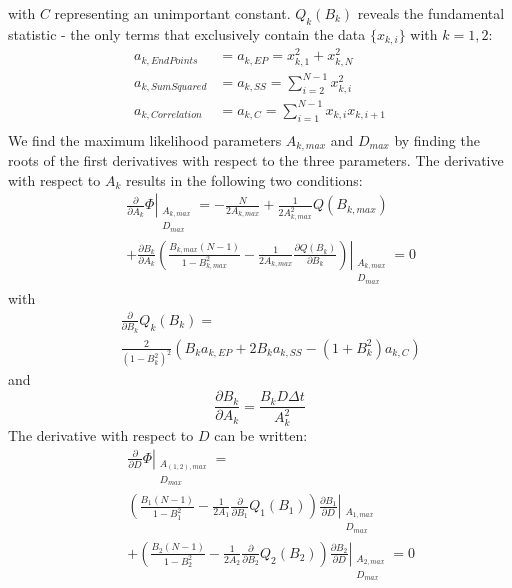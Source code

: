 \documentclass[%
 reprint,
 amsmath,amssymb,
 aps,
]{revtex4-1}
\begin{document}
with $C$ representing an unimportant constant. $Q_{k}(B_{k})$ reveals the fundamental statistic - the only terms that exclusively contain the data $\{x_{k,i}\}$ with $k=1,2$:
\begin{equation}
	\begin{aligned}
		a_{k,EndPoints}&=a_{k,EP}=x_{k,1}^{2}+x_{k,N}^{2}\\
		a_{k,SumSquared}&=a_{k,SS}=\sum\limits_{i=2}^{N-1}x_{k,i}^{2}\\
		a_{k,Correlation}&=a_{k,C}=\sum\limits_{i=1}^{N-1}x_{k,i}x_{k,i+1}\\
	\end{aligned}
\end{equation}
We find the maximum likelihood parameters $A_{k,max}$ and $D_{max}$ by finding the roots of the first derivatives with respect to the three parameters.  The derivative with respect to $A_{k}$ results in the following two conditions:
\begin{eqnarray}\label{partialsigma}
	&&\left.\frac{\partial}{\partial A_{k}}\Phi\right|_{\substack{A_{k,max}\\D_{max}}} = -\frac{N}{2A_{k,max}}
	+\frac{1}{2A_{k,max}^{2}}Q(B_{k,max})\\
	&&+\frac{\partial B_{k}}{\partial A_{k}}\left.\left(\frac{B_{k,max}(N-1)}{1-B_{k,max}^2}
	 -\frac{1}{2A_{k,max}}
	 \frac{\partial Q(B_{k})}{\partial B_{k}}
	 \right)\right|_{\substack{A_{k,max}\\D_{max}}}=0\nonumber
\end{eqnarray}
with
\begin{eqnarray}
	&&\frac{\partial}{\partial B_{k}}Q_{k}(B_{k}) =  \\
	&&\frac{2}{(1-B_{k}^{2})^{2}}\left(B_{k}a_{k,EP}+2B_{k}a_{k,SS}-(1+B_{k}^{2})a_{k,C}\right)\nonumber
\end{eqnarray}
and
\begin{equation}
	\frac{\partial B_{k}}{\partial A_{k}} = \frac{B_{k}D\Delta t}{A_{k}^{2}}
\end{equation}
The derivative with respect to $D$ can be written:
\begin{eqnarray}\label{partiald}
	&&\left.\frac{\partial}{\partial D}\Phi\right|_{\substack{A_{(1,2),max}\\D_{max}}} =\\
	&&\left(\frac{B_{1}(N-1)}{1-B_{1}^{2}}
	-\frac{1}{2A_{1}}\frac{\partial}{\partial B_{1}}Q_{1}(B_{1})\right)\left.
	\frac{\partial B_{1}}{\partial D}\right|_{\substack{A_{1,max}\\D_{max}}}\nonumber\\
	&&+\left(\frac{B_{2}(N-1)}{1-B_{2}^{2}}
	-\frac{1}{2A_{2}}\frac{\partial}{\partial B_{2}}Q_{2}(B_{2})\right)\left.
	\frac{\partial B_{2}}{\partial D}\right|_{\substack{A_{2,max}\\D_{max}}}=0\nonumber
\end{eqnarray}
\end{document}
